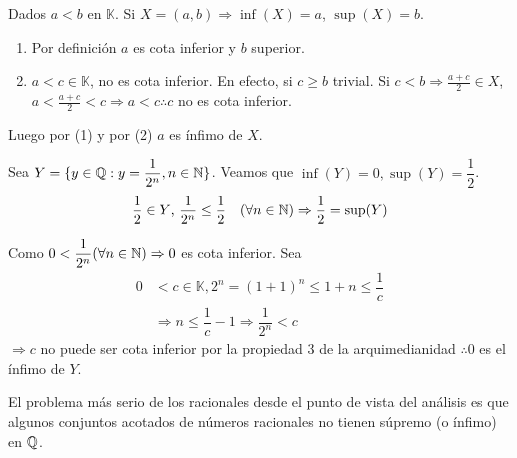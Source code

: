 \begin{eg}
    Dados \(a<b\) en \(\mathbb{K} \). Si \(X=(a,b) \Rightarrow \inf(X)=a\), \(\sup(X)=b\).
    \begin{enumerate}
        \item Por definición \(a\) es cota inferior y \(b\) superior.
        \item \(a < c \in \mathbb{K} \), no es cota inferior. En efecto, si \(c \geq b\) trivial. Si \(c < b \Rightarrow \frac{a+c}{2} \in X\),
              \(a < \frac{a+c}{2} < c \Rightarrow a < c \therefore c\) no es cota inferior.
    \end{enumerate}
    Luego por (1) y por (2) \(a\) es ínfimo de \(X\).
\end{eg}

\begin{eg}
    Sea \(Y = \{ y \in \mathbb{Q} : y=\dfrac{1}{2^n}, n\in \mathbb{N} \} \). Veamos que \(\inf(Y) =0, \sup(Y) = \dfrac{1}{2} \).
    \begin{align*}
        \dfrac{1}{2} \in Y \text{, } \dfrac{1}{2^n} \leq \dfrac{1}{2} \quad (\forall n \in \mathbb{N}) \Rightarrow \dfrac{1}{2} = \sup(Y)
    \end{align*}

    Como \(0 < \dfrac{1}{2^n} (\forall n \in \mathbb{N}) \Rightarrow 0\) es cota inferior.
    Sea \begin{align*}
        0 & < c \in \mathbb{K}, 2^n = {(1+1)}^n \leq 1+n \leq \dfrac{1}{c}       \\
          & \Rightarrow n \leq \dfrac{1}{c} - 1 \Rightarrow \dfrac{1}{2^n} < c
    \end{align*}
    \(\Rightarrow c\) no puede ser cota inferior por la propiedad 3 de la arquimedianidad \(\therefore 0\) es el ínfimo de \(Y\).
\end{eg}

El problema más serio de los racionales desde el punto de vista del análisis es que algunos conjuntos acotados de números racionales no tienen súpremo (o ínfimo) en \(\mathbb{Q} \).

